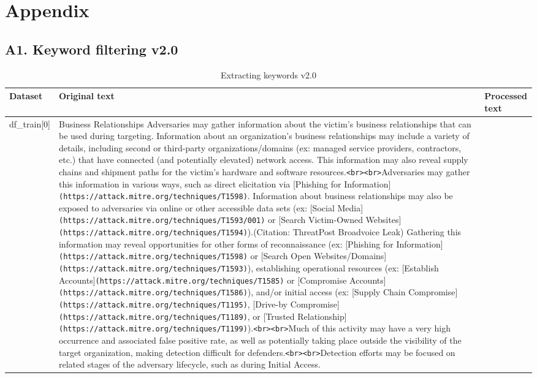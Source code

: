 \section*{Appendix}

\subsection*{A1. Keyword filtering v2.0}\label{subsec:appendix1}
\begin{table}[H]
    \caption{Extracting keywords v2.0}
    \label{crouch}
    \begin{tabularx}{\textwidth}{p{}XX}
        \toprule
        \textbf{Dataset} & \textbf{Original text} & \textbf{Processed text} \\
        \midrule
        df\_train[0] &
        Business Relationships Adversaries may gather information about the victim's business relationships that can be used during targeting. Information about an organization's business relationships may include a variety of details, including second or third-party organizations/domains (ex: managed service providers, contractors, etc.) that have connected (and potentially elevated) network access. This information may also reveal supply chains and shipment paths for the victim's hardware and software resources.\verb|<br><br>|Adversaries may gather this information in various ways, such as direct elicitation via [Phishing for Information]\nolinkurl{(https://attack.mitre.org/techniques/T1598)}. Information about business relationships may also be exposed to adversaries via online or other accessible data sets (ex: [Social Media]\nolinkurl{(https://attack.mitre.org/techniques/T1593/001)} or [Search Victim-Owned Websites]\nolinkurl{(https://attack.mitre.org/techniques/T1594)}).(Citation: ThreatPost Broadvoice Leak) Gathering this information may reveal opportunities for other forms of reconnaissance (ex: [Phishing for Information]\nolinkurl{(https://attack.mitre.org/techniques/T1598)} or [Search Open Websites/Domains]\nolinkurl{(https://attack.mitre.org/techniques/T1593)}), establishing operational resources (ex: [Establish Accounts]\nolinkurl{(https://attack.mitre.org/techniques/T1585)} or [Compromise Accounts]\nolinkurl{(https://attack.mitre.org/techniques/T1586)}), and/or initial access (ex: [Supply Chain Compromise]\nolinkurl{(https://attack.mitre.org/techniques/T1195)}, [Drive-by Compromise]\nolinkurl{(https://attack.mitre.org/techniques/T1189)}, or [Trusted Relationship]\nolinkurl{(https://attack.mitre.org/techniques/T1199)}).\verb|<br><br>|Much of this activity may have a very high occurrence and associated false positive rate, as well as potentially taking place outside the visibility of the target organization, making detection difficult for defenders.\verb|<br><br>|Detection efforts may be focused on related stages of the adversary lifecycle, such as during Initial Access.

\end{tabularx}
\end{table}
